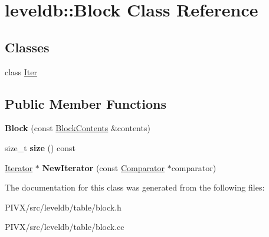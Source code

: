\hypertarget{classleveldb_1_1_block}{}\section{leveldb\+:\+:Block Class Reference}
\label{classleveldb_1_1_block}
\subsection*{Classes}
\begin{DoxyCompactItemize}
\item 
class \mbox{\hyperlink{classleveldb_1_1_block_1_1_iter}{Iter}}
\end{DoxyCompactItemize}
\subsection*{Public Member Functions}
\begin{DoxyCompactItemize}
\item 
\mbox{\label{classleveldb_1_1_block_a242f2101a3c906b6f75f5c008e3ecdd9}} 
{\bfseries Block} (const \mbox{\hyperlink{structleveldb_1_1_block_contents}{Block\+Contents}} \&contents)
\item 
\mbox{\label{classleveldb_1_1_block_a032bc7141317285647397ba1e116b1eb}} 
size\+\_\+t {\bfseries size} () const
\item 
\mbox{\label{classleveldb_1_1_block_a336289029f37d18d31a1a3c178afc7b3}} 
\mbox{\hyperlink{classleveldb_1_1_iterator}{Iterator}} $\ast$ {\bfseries New\+Iterator} (const \mbox{\hyperlink{structleveldb_1_1_comparator}{Comparator}} $\ast$comparator)
\end{DoxyCompactItemize}


The documentation for this class was generated from the following files\+:\begin{DoxyCompactItemize}
\item 
P\+I\+V\+X/src/leveldb/table/block.\+h\item 
P\+I\+V\+X/src/leveldb/table/block.\+cc\end{DoxyCompactItemize}
